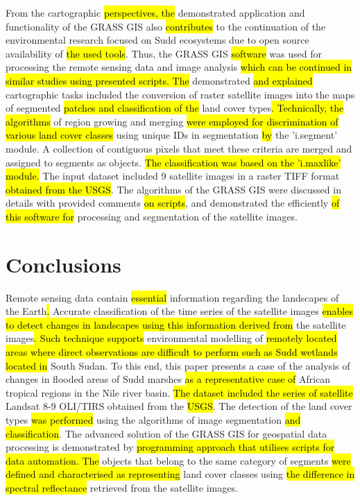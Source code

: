 \documentclass[sustainability,article,submit,pdftex,moreauthors]{Definitions/mdpi}
\begin{document}
From the cartographic \hl{perspectives, the }demonstrated application and functionality of the GRASS GIS\hl{ }also \hl{contributes} to the continuation of the\hl{ }environmental\hl{ }research focused on Sudd ecosystems due to open source availability of \hl{the used tools}. Thus, the GRASS GIS \hl{software }was used for processing the remote sensing data and image analysis \hl{which can be continued in similar studies using presented scripts. The} demonstrated \hl{and explained }cartographic tasks included the conversion of raster satellite images into the maps of segmented \hl{patches and classification of the }land cover types\hl{. Technically, the algorithms} of region growing and merging \hl{were employed for discrimination of various land cover classes }using unique IDs in segmentation\hl{ by} the 'i.segment' module.\hl{ }A collection of contiguous pixels that meet these criteria are merged and assigned to segments as objects. \hl{The classification was based on the 'i.maxlike' module. }The input dataset included 9\hl{ }satellite images in a raster TIFF format \hl{obtained from the USGS}. The algorithms of the GRASS GIS were discussed in details with provided comments \hl{on scripts}, and demonstrated the efficiently \hl{of this software for }processing and segmentation of the satellite images.

\section{Conclusions}

Remote sensing data contain \hl{essential }information regarding the landscapes of the Earth\hl{. }Accurate classification of the time series of the satellite images \hl{enables to detect changes in landscapes using this information derived from} the satellite images\hl{. Such technique supports} environmental modelling of \hl{remotely located areas where direct observations are difficult to perform such as Sudd wetlands located in} South Sudan. To\hl{ }this end, this paper presents a case of the analysis of changes in flooded areas of Sudd marshes \hl{as a representative case of }African tropical regions in the Nile river basin. \hl{The dataset included the series of satellite }Landsat 8-9 OLI/TIRS obtained from the \hl{USGS}. The detection of the land cover types \hl{was performed} using the\hl{ }algorithms of image segmentation \hl{and classification}. The advanced solution of the GRASS GIS\hl{ }for geospatial data processing is demonstrated by \hl{programming approach that utilises scripts for data automation. The} objects that belong to the same category of segments \hl{were defined and characterised as representing} land cover classes using \hl{the difference in spectral reflectance }retrieved from the satellite images. 
\end{document}
